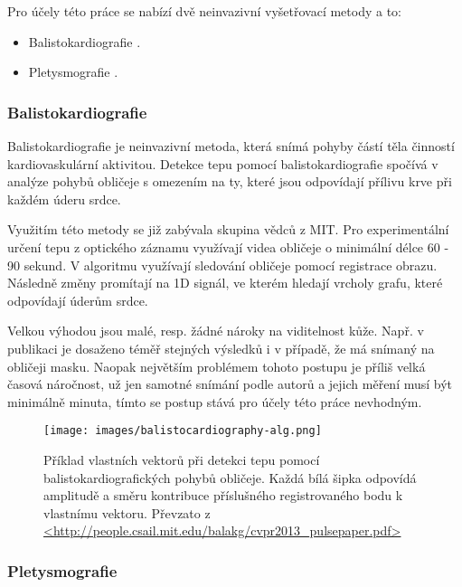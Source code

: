 \documentclass[
  digital, %
  table,   %
%
  lof,     %
  lot,     %
]{fithesis3}
\begin{document}
Pro účely této práce se nabízí dvě neinvazivní vyšetřovací metody a to:
\begin{itemize}
	\item Balistokardiografie
    	\cite{balistography-source}.
    \item Pletysmografie
    	\cite{remote-plethysmographic}.
\end{itemize}

\subsubsection{Balistokardiografie}
Balistokardiografie je neinvazivní metoda, která snímá pohyby částí těla činností kardiovaskulární aktivitou. Detekce tepu pomocí balistokardiografie spočívá v analýze pohybů obličeje s omezením na ty, které jsou odpovídají přílivu krve při každém úderu srdce.

Využitím této metody se již zabývala skupina vědců z MIT\cite{headmotion-detection}. Pro experimentální určení tepu z optického záznamu využívají videa obličeje o minimální délce 60 - 90 sekund. V algoritmu využívají sledování obličeje pomocí registrace obrazu. Následně změny promítají na 1D signál, ve kterém hledají vrcholy grafu, které odpovídají úderům srdce.

Velkou výhodou jsou malé, resp. žádné nároky na viditelnost kůže. Např. v publikaci je dosaženo téměř stejných výsledků i v případě, že má snímaný na obličeji masku. Naopak největším problémem tohoto postupu je příliš velká časová náročnost, už jen samotné snímání podle autorů a jejich měření musí být minimálně minuta, tímto se postup stává pro účely této práce nevhodným.

\begin{figure}
  \begin{center}
    \texttt{[image: images/balistocardiography-alg.png]}
  \end{center}
  \caption{Příklad vlastních vektorů při detekci tepu pomocí balistokardiografických pohybů obličeje. Každá bílá šipka odpovídá amplitudě a směru kontribuce příslušného registrovaného bodu k vlastnímu vektoru. Převzato z \url{<http://people.csail.mit.edu/balakg/cvpr2013_pulsepaper.pdf>}}
  \label{fig:balistografie-princip}
\end{figure}

\subsubsection{Pletysmografie}
\end{document}
